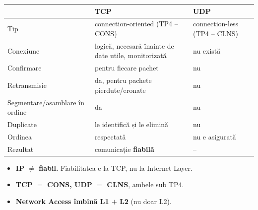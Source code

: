 \documentclass[11pt,a4paper]{article}
\begin{document}
\medskip
\renewcommand{\arraystretch}{1.3}
\begin{tabularx}{\linewidth}{@{}p{3.4cm} Y Y@{}}
\toprule
 & \textbf{TCP} & \textbf{UDP}\\
\midrule
Tip & connection-oriented (TP4 -- CONS) & connection-less (TP4 -- CLNS)\\
Conexiune & logică, necesară înainte de date utile, monitorizată & nu există\\
Confirmare & pentru fiecare pachet & nu\\
Retransmisie & da, pentru pachete pierdute/eronate & nu\\
Segmentare/asamblare în ordine & da & nu\\
Duplicate & le identifică și le elimină & nu\\
Ordinea & respectată & nu e asigurată\\
Rezultat & comunicație \textbf{fiabilă} & --\\
\bottomrule
\end{tabularx}

\bigskip
\begin{capcana}
\begin{itemize}
  \item \textbf{IP $\neq$ fiabil.} Fiabilitatea e la TCP, nu la Internet Layer.
  \item \textbf{TCP $=$ CONS, UDP $=$ CLNS}, ambele sub TP4.
  \item \textbf{Network Access îmbină L1 $+$ L2} (nu doar L2).
\end{itemize}
\end{capcana}
\end{document}
